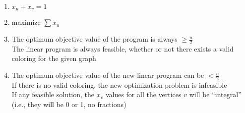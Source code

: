 \documentclass[11pt]{article}
\begin{document}
\begin{enumerate}
    \item $x_u + x_v = 1$
    \item maximize $\sum{x_u}$
    \item 
    The optimum objective value of the program is always $\geq \frac{n}{2}$\\
    The linear program is always feasible, whether or not there exists a valid coloring for the given graph
    \item 
    The optimum objective value of the new linear program can be $< \frac{n}{2}$\\
    If there is no valid coloring, the new optimization problem is infeasible\\
    If any feasible solution, the $x_v$ values for all the vertices $v$ will be ``integral'' (i.e., they will be 0 or 1, no fractions)
\end{enumerate}
\end{document}
